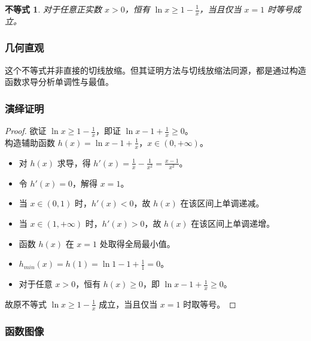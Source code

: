 \documentclass[a4paper,12pt]{ctexart}
\theoremstyle{mytheoremstyle}
\newtheorem{theorem}{不等式}
\begin{document}
\begin{theorem}
对于任意正实数 $x>0$，恒有 $\ln x \ge 1 - \frac{1}{x}$，当且仅当 $x=1$ 时等号成立。
\end{theorem}

\subsubsection*{\textcolor{MyGreen}{几何直观}}
这个不等式并非直接的切线放缩。但其证明方法与切线放缩法同源，都是通过构造函数求导分析单调性与最值。

\subsubsection*{\textcolor{MyGreen}{演绎证明}}
\begin{proof}
欲证 $\ln x \ge 1 - \frac{1}{x}$，即证 $\ln x - 1 + \frac{1}{x} \ge 0$。\\
构造辅助函数 $h(x) = \ln x - 1 + \frac{1}{x}$，$x \in (0, +\infty)$。
\begin{itemize}
    \item[∵] 对 $h(x)$ 求导，得 $h'(x) = \frac{1}{x} - \frac{1}{x^2} = \frac{x-1}{x^2}$。
    \item[∵] 令 $h'(x) = 0$，解得 $x=1$。
    \item[∵] 当 $x \in (0, 1)$ 时，$h'(x) < 0$，故 $h(x)$ 在该区间上单调递减。
    \item[∵] 当 $x \in (1, +\infty)$ 时，$h'(x) > 0$，故 $h(x)$ 在该区间上单调递增。
    \item[∴] 函数 $h(x)$ 在 $x=1$ 处取得全局最小值。
    \item[∵] $h_{min}(x) = h(1) = \ln 1 - 1 + \frac{1}{1} = 0$。
    \item[∴] 对于任意 $x > 0$，恒有 $h(x) \ge 0$，即 $\ln x - 1 + \frac{1}{x} \ge 0$。
\end{itemize}
故原不等式 $\ln x \ge 1 - \frac{1}{x}$ 成立，当且仅当 $x=1$ 时取等号。
\end{proof}

\subsubsection*{\textcolor{MyGreen}{函数图像}}
\begin{center}
\end{center}
\end{document}
